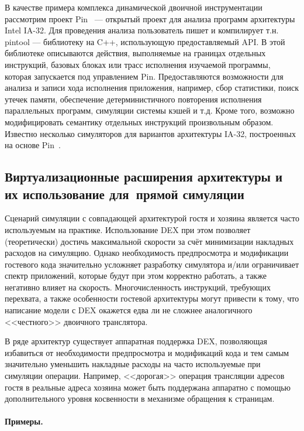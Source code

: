 В качестве примера комплекса динамической двоичной инструментации рассмотрим проект Pin~\cite{pin} --- открытый проект для анализа программ архитектуры Intel IA-32. Для проведения анализа пользователь пишет и компилирует т.н. pintool --- библиотеку на C++, использующую предоставляемый API. В этой библиотеке описываются действия, выполняемые на границах отдельных инструкций, базовых блоках или трасс исполнения изучаемой программы, которая запускается под управлением Pin. Предоставляются возможности для анализа и записи хода исполнения приложения, например, сбор статистики, поиск утечек памяти, обеспечение детерминистичного повторения исполнения параллельных программ, симуляции системы кэшей и т.д. Кроме того, возможно модифицировать семантику отдельных инструкций произвольным образом.  Известно несколько симуляторов для вариантов архитектуры IA-32, построенных на основе Pin~\cite{intel-sde, graphite2010, cmpsim, carlson2011etloafsaapms}.

\subsection[Виртуализационные расширения]{Виртуализационные расширения архитектуры и их использование для~прямой симуляции}

Сценарий симуляции с совпадающей архитектурой гостя и хозяина является часто используемым на практике. Использование DEX при этом позволяет (теоретически) достичь максимальной скорости за счёт минимизации накладных расходов на симуляцию. Однако необходимость предпросмотра и модификации гостевого кода значительно усложняет разработку симулятора и/или  ограничивает спектр приложений, которые будут при этом корректно работать, а также негативно влияет на скорость. Многочисленность инструкций, требующих перехвата, а также особенности гостевой архитектуры могут привести к тому, что написание модели с DEX окажется едва ли не сложнее аналогичного <<честного>> двоичного транслятора.

В ряде архитектур существует аппаратная поддержка DEX, позволяющая избавиться от необходимости предпросмотра и модификаций кода и тем самым значительно уменьшить накладные расходы на часто используемые при симуляции операции. Например, <<дорогая>> операция трансляции адресов гостя в реальные адреса хозяина может быть поддержана аппаратно с помощью дополнительного уровня косвенности в механизме обращения к страницам.

\paragraph{Примеры.}

